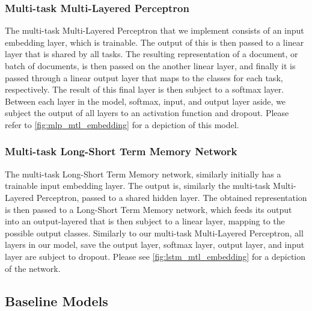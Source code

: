 \subsubsection{Multi-task Multi-Layered Perceptron}

The multi-task Multi-Layered Perceptron that we implement consists of an input embedding layer, which is trainable. The output of this is then passed to a linear layer that is shared by all tasks. The resulting representation of a document, or batch of documents, is then passed on the another linear layer, and finally it is passed through a linear output layer that maps to the classes for each task, respectively. The result of this final layer is then subject to a softmax layer. Between each layer in the model, softmax, input, and output layer aside, we subject the output of all layers to an activation function and dropout. Please refer to \autoref{fig:mlp_mtl_embedding} for a depiction of this model.


\subsubsection{Multi-task Long-Short Term Memory Network}

The multi-task Long-Short Term Memory network, similarly initially has a trainable input embedding layer. The output is, similarly the multi-task Multi-Layered Perceptron, passed to a shared hidden layer. The obtained representation is then passed to a Long-Short Term Memory network, which feeds its output into an output-layered that is then subject to a linear layer, mapping to the possible output classes. Similarly to our multi-task Multi-Layered Perceptron, all layers in our model, save the output layer, softmax layer, output layer, and input layer are subject to dropout. Please see \autoref{fig:lstm_mtl_embedding} for a depiction of the network.

\subsection{Baseline Models}

